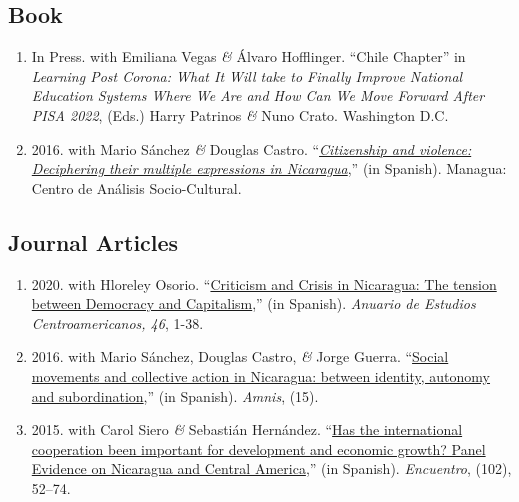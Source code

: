 \documentclass[a4paper, 10pt]{article}
\begin{document}
\subsection*{Book}

\begin{enumerate}[leftmargin=10pt, label={}, itemindent=-10pt, nosep]
\item In Press. with Emiliana Vegas \textit{\&} Álvaro Hofflinger. ``Chile
Chapter'' in \textit{Learning Post Corona: What It Will take to Finally Improve
National Education Systems Where We Are and How Can We Move Forward After PISA
2022}, (Eds.) Harry Patrinos \textit{\&} Nuno Crato. Washington D.C.
\item 2016. with Mario Sánchez \textit{\&} Douglas Castro. ``\emph{\href{http://biblioteca.clacso.edu.ar/Nicaragua/casc-uca/20150313124733/Ciudadania-y-violencia.pdf}{Citizenship and violence: Deciphering their multiple expressions in Nicaragua}},'' (in Spanish). Managua: Centro de Análisis Socio-Cultural.
\end{enumerate}

\subsection*{Journal Articles}

\begin{enumerate}[leftmargin=10pt, label={}, itemindent=-10pt, nosep]
\item 2020. with Hloreley Osorio. ``\href{https://revistas.ucr.ac.cr/index.php/anuario/article/view/45081/44860}{Criticism and Crisis in Nicaragua: The tension between Democracy and Capitalism},'' (in Spanish). \emph{Anuario de Estudios Centroamericanos, 46}, 1-38.

\item 2016. with Mario Sánchez, Douglas Castro, \textit{\&} Jorge Guerra. ``\href{https://amnis.revues.org/2813}{Social movements and collective action in Nicaragua: between identity, autonomy and subordination},'' (in Spanish). \emph{Amnis}, (15).

\item 2015. with Carol Siero \textit{\&} Sebastián Hernández. ``\href{http://www.uca.edu.ni/2/images/Revista-Encuentro/Revistas/e102/art-5.pdf}{Has the international cooperation been important for development and economic growth? Panel Evidence on Nicaragua and Central America},'' (in Spanish). \emph{Encuentro}, (102), 52--74.
\end{enumerate}
\end{document}
